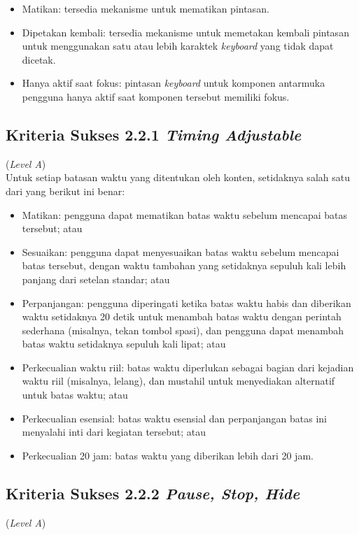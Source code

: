 \begin{itemize}
	\item Matikan: tersedia mekanisme untuk mematikan pintasan.
	\item Dipetakan kembali: tersedia mekanisme untuk memetakan kembali pintasan untuk menggunakan satu atau lebih karaktek \textit{keyboard} yang tidak dapat dicetak.
	\item Hanya aktif saat fokus: pintasan \textit{keyboard} untuk komponen antarmuka pengguna hanya aktif saat komponen tersebut memiliki fokus.
\end{itemize}

\subsection{Kriteria Sukses 2.2.1 \textit{Timing Adjustable}}
\label{subsec:kriteria_2.2.1}
(\textit{Level A}) \\

Untuk setiap batasan waktu yang ditentukan oleh konten, setidaknya salah satu dari yang berikut ini benar:

\begin{itemize}
	\item Matikan: pengguna dapat mematikan batas waktu sebelum mencapai batas tersebut; atau
	\item Sesuaikan: pengguna dapat menyesuaikan batas waktu sebelum mencapai batas tersebut, dengan waktu tambahan yang setidaknya sepuluh kali lebih panjang dari setelan standar; atau
	\item Perpanjangan: pengguna diperingati ketika batas waktu habis dan diberikan waktu setidaknya 20 detik untuk menambah batas waktu dengan perintah sederhana (misalnya, tekan tombol spasi), dan pengguna dapat menambah batas waktu setidaknya sepuluh kali lipat; atau
	\item Perkecualian waktu riil: batas waktu diperlukan sebagai bagian dari kejadian waktu riil (misalnya, lelang), dan mustahil untuk menyediakan alternatif untuk batas waktu; atau
	\item Perkecualian esensial: batas waktu esensial dan perpanjangan batas ini menyalahi inti dari kegiatan tersebut; atau
	\item Perkecualian 20 jam: batas waktu yang diberikan lebih dari 20 jam.
\end{itemize}

\subsection{Kriteria Sukses 2.2.2 \textit{Pause, Stop, Hide}}
\label{subsec:kriteria_2.2.2}
(\textit{Level A}) \\

